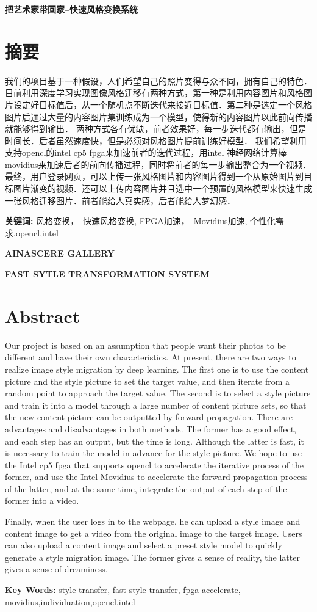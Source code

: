 \centerline{\bfseries{} 把艺术家带回家--快速风格变换系统}
\section*{ \centering 摘要}
我们的项目基于一种假设，人们希望自己的照片变得与众不同，拥有自己的特色．
目前利用深度学习实现图像风格迁移有两种方式，第一种是利用内容图片和风格图片设定好目标值后，从一个随机点不断迭代来接近目标值．第二种是选定一个风格图片后通过大量的内容图片集训练成为一个模型，使得新的内容图片以此前向传播就能够得到输出．
两种方式各有优缺，前者效果好，每一步迭代都有输出，但是时间长．后者虽然速度快，但是必须对风格图片提前训练好模型．
我们希望利用支持opencl的intel cp5 fpga来加速前者的迭代过程，用intel 神经网络计算棒movidius来加速后者的前向传播过程，同时将前者的每一步输出整合为一个视频．
最终，用户登录网页，可以上传一张风格图片和内容图片得到一个从原始图片到目标图片渐变的视频．还可以上传内容图片并且选中一个预置的风格模型来快速生成一张风格迁移图片．前者能给人真实感，后者能给人梦幻感．
\vskip0.5cm

\textbf{关键词:}  风格变换，　快速风格变换, FPGA加速，　Movidius加速, 个性化需求,opencl,intel

\clearpage
\centerline{\bfseries{} AINASCERE GALLERY}
\centerline{\bfseries{} FAST SYTLE TRANSFORMATION SYSTEM}
\section*{ \centering \textbf{Abstract} }

Our project is based on an assumption that people want their photos to be different and have their own characteristics.
At present, there are two ways to realize image style migration by deep learning. The first one is to use the content picture and the style picture to set the target value, and then iterate from a random point to approach the target value. The second is to select a style picture and train it into a model through a large number of content picture sets, so that the new content picture can be outputted by forward propagation.
There are advantages and disadvantages in both methods. The former has a good effect, and each step has an output, but the time is long. Although the latter is fast, it is necessary to train the model in advance for the style picture.
We hope to use the Intel cp5 fpga that supports opencl to accelerate the iterative process of the former, and use the Intel Movidius to accelerate the forward propagation process of the latter, and at the same time, integrate the output of each step of the former into a video.

Finally, when the user logs in to the webpage, he can upload a style image and content image to get a video from the original image to the target image. Users can also upload a content image and select a preset style model to quickly generate a style migration image. The former gives a sense of reality, the latter gives a sense of dreaminess.

\textbf{Key Words:} style transfer, fast style transfer, fpga accelerate, movidius,individuation,opencl,intel




